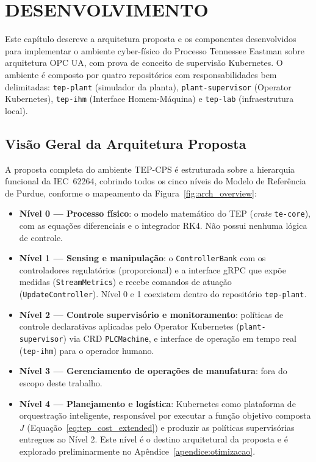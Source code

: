 \chapter{DESENVOLVIMENTO}
\label{cha:desenvolvimento}

Este capítulo descreve a arquitetura proposta e os componentes desenvolvidos para implementar o ambiente cyber-físico do Processo Tennessee Eastman sobre arquitetura OPC UA, com prova de conceito de supervisão Kubernetes. O ambiente é composto por quatro repositórios com responsabilidades bem delimitadas: \texttt{tep-plant} (simulador da planta), \texttt{plant-supervisor} (Operator Kubernetes), \texttt{tep-ihm} (Interface Homem-Máquina) e \texttt{tep-lab} (infraestrutura local).

\section{Visão Geral da Arquitetura Proposta}
\label{sec:arch}

A proposta completa do ambiente TEP-CPS é estruturada sobre a hierarquia funcional da IEC~62264, cobrindo todos os cinco níveis do Modelo de Referência de Purdue, conforme o mapeamento da Figura~\ref{fig:arch_overview}:

\begin{itemize}
  \item \textbf{Nível 0 — Processo físico}: o modelo matemático do TEP (\textit{crate} \texttt{te-core}), com as equações diferenciais e o integrador RK4. Não possui nenhuma lógica de controle.
  \item \textbf{Nível 1 — Sensing e manipulação}: o \texttt{ControllerBank} com os controladores regulatórios (proporcional) e a interface gRPC que expõe medidas (\texttt{StreamMetrics}) e recebe comandos de atuação (\texttt{UpdateController}). Nível 0 e 1 coexistem dentro do repositório \texttt{tep-plant}.
  \item \textbf{Nível 2 — Controle supervisório e monitoramento}: políticas de controle declarativas aplicadas pelo Operator Kubernetes (\texttt{plant-supervisor}) via CRD \texttt{PLCMachine}, e interface de operação em tempo real (\texttt{tep-ihm}) para o operador humano.
  \item \textbf{Nível 3 — Gerenciamento de operações de manufatura}: fora do escopo deste trabalho.
  \item \textbf{Nível 4 — Planejamento e logística}: Kubernetes como plataforma de orquestração inteligente, responsável por executar a função objetivo composta $J$ (Equação~\ref{eq:tep_cost_extended}) e produzir as políticas supervisórias entregues ao Nível 2. Este nível é o destino arquitetural da proposta e é explorado preliminarmente no Apêndice~\ref{apendice:otimizacao}.
\end{itemize}

